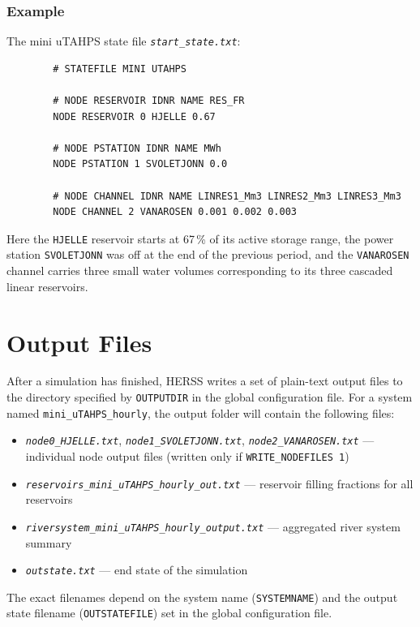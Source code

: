 \documentclass[a4paper, 12pt]{report}
\newcommand{\file}[1]{\textit{\texttt{#1}}}  %
\begin{document}
	\subsubsection{Example}
	
	The mini uTAHPS state file \file{start\_state.txt}:
	
	\begin{verbatim}
		# STATEFILE MINI UTAHPS
		
		# NODE RESERVOIR IDNR NAME RES_FR
		NODE RESERVOIR 0 HJELLE 0.67
		
		# NODE PSTATION IDNR NAME MWh
		NODE PSTATION 1 SVOLETJONN 0.0
		
		# NODE CHANNEL IDNR NAME LINRES1_Mm3 LINRES2_Mm3 LINRES3_Mm3
		NODE CHANNEL 2 VANAROSEN 0.001 0.002 0.003
	\end{verbatim}
	
	Here the \texttt{HJELLE} reservoir starts at 67\,\% of its active storage range, the
	power station \texttt{SVOLETJONN} was off at the end of the previous period, and the
	\texttt{VANAROSEN} channel carries three small water volumes corresponding to its three
	cascaded linear reservoirs.



	\section{Output Files}
	\label{sec:output}

	After a simulation has finished, HERSS writes a set of plain-text output files to the
	directory specified by \texttt{OUTPUTDIR} in the global configuration file. For a system
	named \texttt{mini\_uTAHPS\_hourly}, the output folder will contain the following files:

	\begin{itemize}
	\item \file{node0\_HJELLE.txt}, \file{node1\_SVOLETJONN.txt}, \file{node2\_VANAROSEN.txt} --- individual node output files (written only if \texttt{WRITE\_NODEFILES 1})
	\item \file{reservoirs\_mini\_uTAHPS\_hourly\_out.txt} --- reservoir filling fractions for all reservoirs
	\item \file{riversystem\_mini\_uTAHPS\_hourly\_output.txt} --- aggregated river system summary
	\item \file{outstate.txt} --- end state of the simulation
	\end{itemize}

	The exact filenames depend on the system name (\texttt{SYSTEMNAME}) and the output state
	filename (\texttt{OUTSTATEFILE}) set in the global configuration file.
\end{document}
